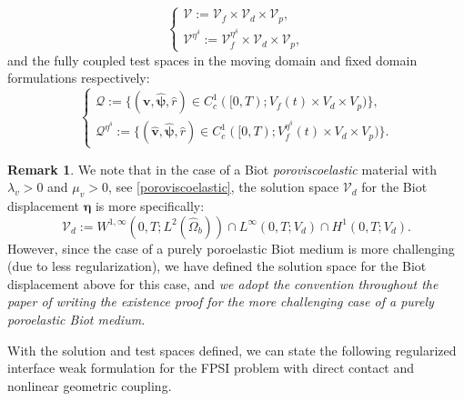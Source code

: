 \documentclass[11pt]{article}
\newcommand{\bd}{\boldsymbol}
\theoremstyle{definition}
\newtheorem{remark}{Remark}[section]
\begin{document}
\begin{equation}\label{directsolution}
\begin{cases}
\mathcal{V} := \mathcal{V}_{f} \times \mathcal{V}_{d} \times \mathcal{V}_{p}, \\
\mathcal{V}^{\eta^{\delta}} := \mathcal{V}_{f}^{\eta^{\delta}} \times \mathcal{V}_{d} \times \mathcal{V}_{p},
\end{cases}
\end{equation}
and the fully coupled test spaces in the moving domain and fixed domain formulations respectively:
\begin{equation}\label{directtest}
\begin{cases}
\mathcal{Q} := \{(\bd{v}, \hat{\bd{\psi}}, \hat{r}) \in C_{c}^{1}([0, T); V_{f}(t) \times V_{d} \times V_{p})\}, \\
\mathcal{Q}^{\eta^{\delta}} := \{(\hat{\bd{v}}, \hat{\bd{\psi}}, \hat{r}) \in C_{c}^{1}([0, T); V^{\eta^{\delta}}_{f}(t) \times V_{d} \times V_{p})\}.
\end{cases}
\end{equation}

\begin{remark}
We note that in the case of a Biot \textit{poroviscoelastic} material with $\lambda_{v} > 0$ and $\mu_{v} > 0$, see \eqref{poroviscoelastic}, the solution space $\mathcal{V}_{d}$ for the Biot displacement $\hat{\bd{\eta}}$ is more specifically:
\begin{equation*}
\mathcal{V}_{d} := W^{1, \infty}(0, T; L^{2}(\hat{\Omega}_{b})) \cap L^{\infty}(0, T; V_{d}) \cap H^{1}(0, T; V_{d}).
\end{equation*}
However, since the case of a purely poroelastic Biot medium is more challenging (due to less regularization), we have defined the solution space for the Biot displacement above for this case, and \textit{we adopt the convention throughout the paper of writing the existence proof for the more challenging case of a purely poroelastic Biot medium.}
\end{remark}

With the solution and test spaces defined, we can state the following regularized interface weak formulation for the FPSI problem with direct contact and nonlinear geometric coupling.
\end{document}
